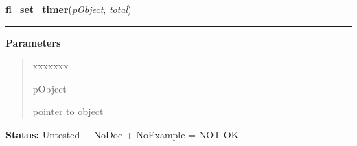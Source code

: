     \label{xformslib:library:fl_set_timer}

    \vspace{0.5ex}

\hspace{.8\funcindent}\begin{boxedminipage}{\funcwidth}

    \raggedright \textbf{fl\_set\_timer}(\textit{pObject}, \textit{total})

    \vspace{-1.5ex}

    \rule{\textwidth}{0.5\fboxrule}
\setlength{\parskip}{2ex}
\setlength{\parskip}{1ex}
      \textbf{Parameters}
      \vspace{-1ex}

      \begin{quote}
        \begin{Ventry}{xxxxxxx}

          \item[pObject]

          pointer to object

        \end{Ventry}

      \end{quote}

\textbf{Status:} Untested + NoDoc + NoExample = NOT OK



    \end{boxedminipage}

    \label{xformslib:library:fl_get_timer}

    \vspace{0.5ex}

